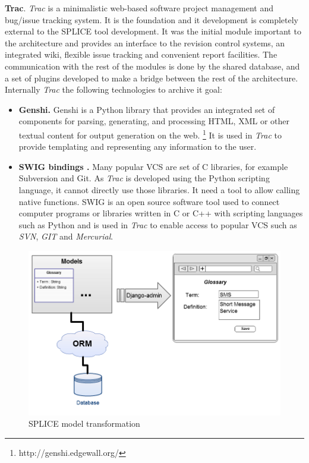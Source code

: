 \textbf{Trac}. \textit{Trac} is a minimalistic web-based software project management and bug/issue tracking system. It is the foundation and it development is completely external to the \ac{SPLICE} tool development. It was the initial module important to the architecture and provides an interface to the revision control systems, an integrated wiki, flexible issue tracking and convenient report facilities. 
The communication with the rest of the modules is done by the shared database, and a set of plugins developed to make a bridge between the rest of the architecture. Internally \textit{Trac} the following technologies to archive it goal:
\begin{itemize}

\item  \textbf{ Genshi.} Genshi is a Python library that provides an integrated set of components for parsing, generating, and processing HTML, XML or other textual content for output generation on the web. \footnote{http://genshi.edgewall.org/} It is used in \textit{Trac} to provide templating and representing any information to the user. 



\item  \textbf{ SWIG bindings .} Many popular \acf{VCS} are set of C libraries, for example Subversion and Git. As \textit{Trac} is developed using the Python scripting language, it cannot directly use those libraries. It need a tool to allow calling native functions. \acf{SWIG} is an open source software tool used to connect computer programs or libraries written in C or C++ with scripting languages such as Python and is used in \textit{Trac} to enable access to popular \ac{VCS} such as  \textit{SVN}, \textit{GIT} and \textit{Mercurial}.

\end{itemize}

\begin{figure}[htp]
\begin{center}
  \includegraphics[width=15cm]{chapters/proposed_solution/img/django-admin.png}
  \caption[SPLICE model transformation]{SPLICE model transformation}
  \label{fg:splice-django-admin}
\end{center}
\end{figure}


